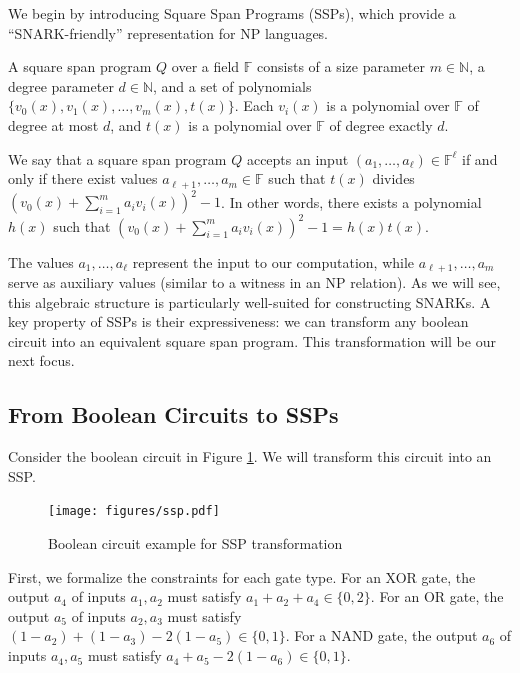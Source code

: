\documentclass[12pt]{tufte-book}
\begin{document}
We begin by introducing Square Span Programs (SSPs), which provide a ``SNARK-friendly'' representation for NP languages.

\begin{definition}
A square span program $Q$ over a field $\mathbb{F}$ consists of a size parameter $m \in \mathbb{N}$, a degree parameter $d \in \mathbb{N}$, and a set of polynomials $\{v_0(x), v_1(x), \dots, v_m(x), t(x)\}$. Each $v_i(x)$ is a polynomial over $\mathbb{F}$ of degree at most $d$, and $t(x)$ is a polynomial over $\mathbb{F}$ of degree exactly $d$.
\end{definition}

\begin{definition}
We say that a square span program $Q$ accepts an input $(a_1, \dots, a_\ell) \in \mathbb{F}^\ell$ if and only if there exist values $a_{\ell+1}, \dots, a_m \in \mathbb{F}$ such that $t(x)$ divides $(v_0(x) + \sum_{i=1}^m a_i v_i(x))^2 - 1$. In other words, there exists a polynomial $h(x)$ such that $(v_0(x) + \sum_{i=1}^m a_i v_i(x))^2 - 1 = h(x)t(x)$.
\end{definition}

The values $a_1, \dots, a_\ell$ represent the input to our computation, while $a_{\ell+1}, \dots, a_m$ serve as auxiliary values (similar to a witness in an NP relation). As we will see, this algebraic structure is particularly well-suited for constructing SNARKs. A key property of SSPs is their expressiveness: we can transform any boolean circuit into an equivalent square span program. This transformation will be our next focus.

\subsection{From Boolean Circuits to SSPs}

Consider the boolean circuit in Figure \ref{fig:ssp}. We will transform this circuit into an SSP.

\begin{figure}[h]
  \centering
  \texttt{[image: figures/ssp.pdf]}
  \caption{Boolean circuit example for SSP transformation \label{fig:ssp}} 
\end{figure}

First, we formalize the constraints for each gate type. For an XOR gate, the output $a_4$ of inputs $a_1, a_2$ must satisfy $a_1 + a_2 + a_4 \in \{0, 2\}$. For an OR gate, the output $a_5$ of inputs $a_2, a_3$ must satisfy $(1-a_2) + (1-a_3) - 2(1-a_5) \in \{0, 1\}$. For a NAND gate, the output $a_6$ of inputs $a_4, a_5$ must satisfy $a_4 + a_5 - 2(1-a_6) \in \{0, 1\}$.
\end{document}
